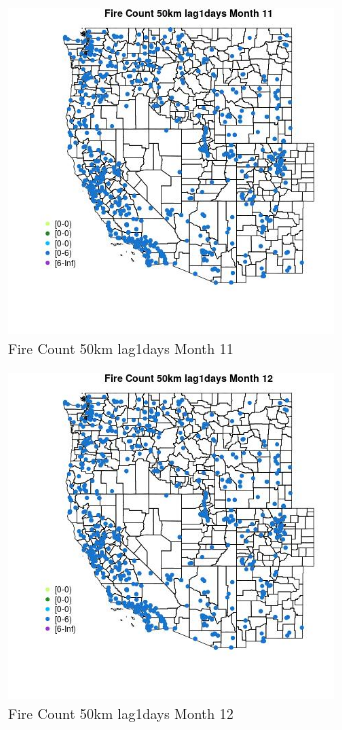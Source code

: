 \begin{figure} 
\centering  
\includegraphics[width=0.77\textwidth]{Code_Outputs/Report_ML_input_PM25_Step4_part_e_de_duplicated_aves_compiled_2019-05-21wNAs_MapObsMo11Fire_Count_50km_lag1days.jpg} 
\caption{\label{fig:Report_ML_input_PM25_Step4_part_e_de_duplicated_aves_compiled_2019-05-21wNAsMapObsMo11Fire_Count_50km_lag1days}Fire Count 50km lag1days Month 11} 
\end{figure} 
 

\begin{figure} 
\centering  
\includegraphics[width=0.77\textwidth]{Code_Outputs/Report_ML_input_PM25_Step4_part_e_de_duplicated_aves_compiled_2019-05-21wNAs_MapObsMo12Fire_Count_50km_lag1days.jpg} 
\caption{\label{fig:Report_ML_input_PM25_Step4_part_e_de_duplicated_aves_compiled_2019-05-21wNAsMapObsMo12Fire_Count_50km_lag1days}Fire Count 50km lag1days Month 12} 
\end{figure} 
 


